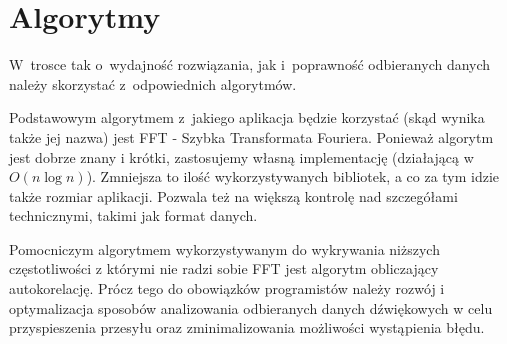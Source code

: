 \documentclass{article}
\begin{document}
\section{Algorytmy}
W~trosce tak o~wydajność rozwiązania, jak i~poprawność odbieranych danych należy
skorzystać z~odpowiednich algorytmów. \par
Podstawowym algorytmem z~jakiego aplikacja będzie korzystać (skąd wynika także
jej nazwa) jest FFT - Szybka Transformata Fouriera. Ponieważ algorytm jest dobrze znany i krótki, zastosujemy własną implementację (działającą w~$O(n\log{}n)$). Zmniejsza to ilość wykorzystywanych bibliotek, a co za tym idzie także rozmiar aplikacji. Pozwala też na większą kontrolę nad szczegółami technicznymi, takimi jak format danych. \par
Pomocniczym algorytmem wykorzystywanym do wykrywania niższych częstotliwości z którymi nie radzi sobie FFT jest algorytm obliczający autokorelację.
Prócz tego do obowiązków programistów należy rozwój i optymalizacja sposobów analizowania odbieranych danych dźwiękowych w celu przyspieszenia przesyłu oraz zminimalizowania możliwości wystąpienia błędu.
\end{document}
